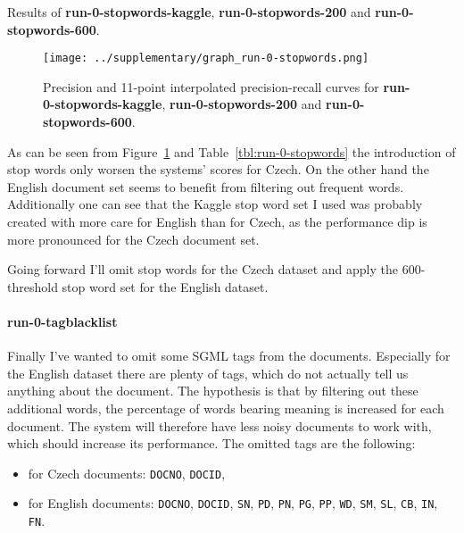 \documentclass[10pt]{article}
\newcommand{\Run}[1]{\textbf{#1}}
\begin{document}
\begin{table}[h]
\centering

    \caption{Results of \Run{run-0-stopwords-kaggle}, \Run{run-0-stopwords-200} and
    \Run{run-0-stopwords-600}.\label{tbl:run-0-stopwords}}
\end{table}

\begin{figure}[h]
\centering
\texttt{[image: ../supplementary/graph\_run-0-stopwords.png]}
    \caption{Precision and 11-point interpolated precision-recall curves for
    \Run{run-0-stopwords-kaggle}, \Run{run-0-stopwords-200} and
    \Run{run-0-stopwords-600}.\label{fig:run-0-stopwords}}
\end{figure}

As can be seen from Figure~\ref{fig:run-0-stopwords} and
Table~\ref{tbl:run-0-stopwords} the introduction of stop words only worsen the
systems' scores for Czech. On the other hand the English document set seems to
benefit from filtering out frequent words. Additionally one can see that the
Kaggle stop word set I used was probably created with more care for English
than for Czech, as the performance dip is more pronounced for the Czech document
set.

Going forward I'll omit stop words for the Czech dataset and apply the
600-threshold stop word set for the English dataset.

\paragraph{run-0-tagblacklist} Finally I've wanted to omit some SGML tags from
the documents. Especially for the English dataset there are plenty of tags,
which do not actually tell us anything about the document. The hypothesis is
that by filtering out these additional words, the percentage of words bearing
meaning is increased for each document. The system will therefore have less
noisy documents to work with, which should increase its performance. The omitted
tags are the following:

\begin{itemize}
    \item for Czech documents: \texttt{DOCNO}, \texttt{DOCID},
    \item for English documents: \texttt{DOCNO}, \texttt{DOCID}, \texttt{SN},
        \texttt{PD}, \texttt{PN}, \texttt{PG}, \texttt{PP}, \texttt{WD},
        \texttt{SM}, \texttt{SL}, \texttt{CB}, \texttt{IN}, \texttt{FN}.
\end{itemize}
\end{document}
